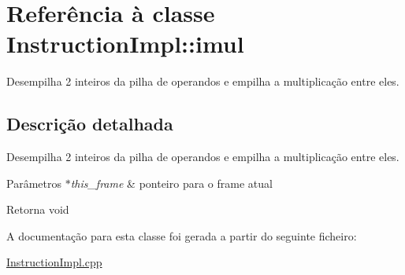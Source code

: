 \hypertarget{class_instruction_impl_1_1imul}{}\section{Referência à classe Instruction\+Impl\+:\+:imul}
\label{class_instruction_impl_1_1imul}


Desempilha 2 inteiros da pilha de operandos e empilha a multiplicação entre eles.  




\subsection{Descrição detalhada}
Desempilha 2 inteiros da pilha de operandos e empilha a multiplicação entre eles. 


\begin{DoxyParams}{Parâmetros}
{\em $\ast$this\+\_\+frame} & ponteiro para o frame atual \\
\hline
\end{DoxyParams}
\begin{DoxyReturn}{Retorna}
void 
\end{DoxyReturn}


A documentação para esta classe foi gerada a partir do seguinte ficheiro\+:\begin{DoxyCompactItemize}
\item 
\hyperlink{_instruction_impl_8cpp}{Instruction\+Impl.\+cpp}\end{DoxyCompactItemize}
